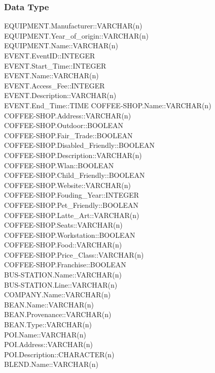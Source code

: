 \subsubsection{Data Type}
EQUIPMENT.Manufacturer::VARCHAR(n)
EQUIPMENT.Year\_of\_origin::VARCHAR(n)
EQUIPMENT.Name::VARCHAR(n)\\
EVENT.EventID::INTEGER\\
EVENT.Start\_Time::INTEGER\\
EVENT.Name::VARCHAR(n)\\
EVENT.Access\_Fee::INTEGER\\
EVENT.Description::VARCHAR(n)\\
EVENT.End\_Time::TIME
COFFEE-SHOP.Name::VARCHAR(n)\\
COFFEE-SHOP.Address::VARCHAR(n)\\
COFFEE-SHOP.Outdoor::BOOLEAN\\
COFFEE-SHOP.Fair\_Trade::BOOLEAN\\
COFFEE-SHOP.Disabled\_Friendly::BOOLEAN\\
COFFEE-SHOP.Description::VARCHAR(n)\\
COFFEE-SHOP.Wlan::BOOLEAN\\
COFFEE-SHOP.Child\_Friendly::BOOLEAN\\
COFFEE-SHOP.Website::VARCHAR(n)\\
COFFEE-SHOP.Fouding\_Year::INTEGER\\
COFFEE-SHOP.Pet\_Friendly::BOOLEAN\\
COFFEE-SHOP.Latte\_Art::VARCHAR(n)\\
COFFEE-SHOP.Seats::VARCHAR(n)\\
COFFEE-SHOP.Workstation::BOOLEAN\\
COFFEE-SHOP.Food::VARCHAR(n)\\
COFFEE-SHOP.Price\_Class::VARCHAR(n)\\
COFFEE-SHOP.Franchise::BOOLEAN\\
BUS-STATION.Name::VARCHAR(n)\\
BUS-STATION.Line::VARCHAR(n)\\
COMPANY.Name::VARCHAR(n)\\
BEAN.Name::VARCHAR(n)\\
BEAN.Provenance::VARCHAR(n)\\
BEAN.Type::VARCHAR(n)\\
POI.Name::VARCHAR(n)\\
POI.Address::VARCHAR(n)\\
POI.Description::CHARACTER(n)\\
BLEND.Name::VARCHAR(n)\\
